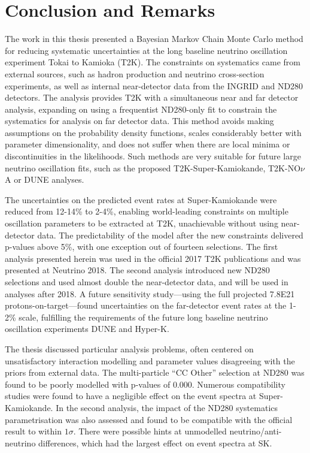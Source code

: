 \chapter{Conclusion and Remarks}
\label{chap:conclusion}
The work in this thesis presented a Bayesian Markov Chain Monte Carlo method for reducing systematic uncertainties at the long baseline neutrino oscillation experiment Tokai to Kamioka (T2K). The constraints on systematics came from external sources, such as hadron production and neutrino cross-section experiments, as well as internal near-detector data from the INGRID and ND280 detectors. The analysis provides T2K with a simultaneous near and far detector analysis, expanding on using a frequentist ND280-only fit to constrain the systematics for analysis on far detector data. This method avoids making assumptions on the probability density functions, scales considerably better with parameter dimensionality, and does not suffer when there are local minima or discontinuities in the likelihoods. Such methods are very suitable for future large neutrino oscillation fits, such as the proposed T2K-Super-Kamiokande, T2K-NO$\nu$A or DUNE analyses.

The uncertainties on the predicted event rates at Super-Kamiokande were reduced from 12-14\% to 2-4\%, enabling world-leading constraints on multiple oscillation parameters to be extracted at T2K, unachievable without using near-detector data. The predictability of the model after the new constraints delivered p-values above 5\%, with one exception out of fourteen selections. The first analysis presented herein was used in the official 2017 T2K publications and was presented at Neutrino 2018. The second analysis introduced new ND280 selections and used almost double the near-detector data, and will be used in analyses after 2018. A future sensitivity study---using the full projected 7.8E21 protons-on-target---found uncertainties on the far-detector event rates at the 1-2\% scale, fulfilling the requirements of the future long baseline neutrino oscillation experiments DUNE and Hyper-K.

The thesis discussed particular analysis problems, often centered on unsatisfactory interaction modelling and parameter values disagreeing with the priors from external data. The multi-particle ``CC Other'' selection at ND280 was found to be poorly modelled with p-values of 0.000. Numerous compatibility studies were found to have a negligible effect on the event spectra at Super-Kamiokande. In the second analysis, the impact of the ND280 systematics parametrisation was also assessed and found to be compatible with the official result to within $1\sigma$. There were possible hints at unmodelled neutrino/anti-neutrino differences, which had the largest effect on event spectra at SK.

